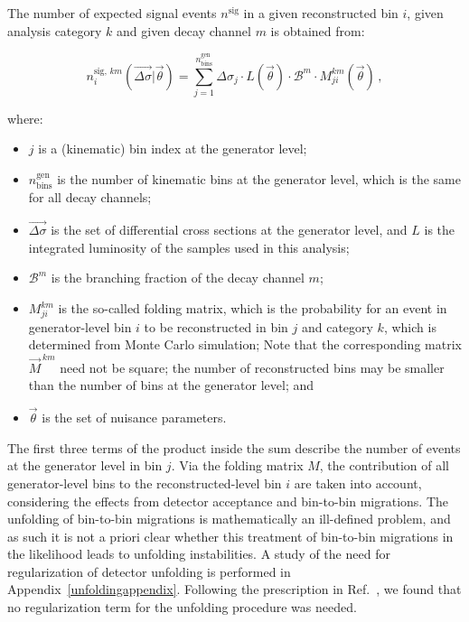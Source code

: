 The number of expected signal events $n^\text{sig}$ in a given reconstructed bin $i$, given analysis category $k$ and given decay channel $m$ is obtained from:
% 
\begin{linenomath*}
\begin{equation}
n_i^{\text{sig},\,km}(\vec{\Delta\sigma} | \vec{\theta})
= \sum_{j=1}^{n_\text{bins}^\text{gen}}
    \Delta\sigma_j \cdot L(\vec{\theta})
     \cdot \mathcal{B}^{m}
     \cdot M_{ji}^{km}(\vec{\theta})
\,,
\label{eq:nsig}
\end{equation}
\end{linenomath*}
% 
where:
% 
\begin{itemize}
\item $j$ is a (kinematic) bin index at the generator level;
% 
\item $n_\text{bins}^\text{gen}$ is the number of kinematic bins at the generator level, which is the same for all decay channels;
% 
\item $\vec{\Delta\sigma}$ is the set of differential cross sections at the generator level, and $L$ is the integrated luminosity of the samples used in this analysis;
% 
\item $\mathcal{B}^m$ is the branching fraction of the decay channel $m$;
% 
\item $M_{ji}^{km}$ is the so-called folding matrix, which is the probability for an event in generator-level bin $i$ to be reconstructed in bin $j$ and category $k$, which is determined from Monte Carlo simulation;
% 
Note that the corresponding matrix $\vec{M}^{\,km}$ need not be square; the number of reconstructed bins may be smaller than the number of bins at the generator level; and
% 
\item $\vec{\theta}$ is the set of nuisance parameters.
\end{itemize}
% 
The first three terms of the product inside the sum describe the number of events at the generator level in bin $j$.
% 
Via the folding matrix $M$, the contribution of all generator-level bins to the reconstructed-level bin $i$ are taken into account, considering the effects from detector acceptance and bin-to-bin migrations.
% 
The unfolding of bin-to-bin migrations is mathematically an ill-defined problem, and as such it is not a priori clear whether this treatment of bin-to-bin migrations in the likelihood leads to unfolding instabilities.
% 
A study of the need for regularization of detector unfolding is performed in Appendix~\ref{unfoldingappendix}.
% 
Following the prescription in Ref.~\cite{Hansen:LShape}, we found that no regularization term for the unfolding procedure was needed. 


